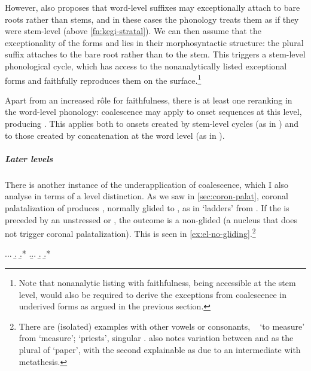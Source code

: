 However, \citet{bermúdez-otero11:_cyclic,bermudez-oterong} also proposes that word-level suffixes may exceptionally attach to bare roots rather than stems, and in these cases the phonology treats them as if they were stem-level (\cf above \cref{fn:kegi-stratal}). We can then assume that the exceptionality of the forms \ipa{[ˈbɒrdiəw]} and \ipa{[avɔˈkadiən]} lies in their morphosyntactic structure: the plural suffix attaches to the bare root rather than to the stem. This triggers a stem-level phonological cycle, which has access to the nonanalytically listed exceptional forms and faithfully reproduces them on the surface.\footnote{Note that nonanalytic listing with faithfulness, being accessible at the stem level, would also be required to derive the exceptions from coalescence in underived forms as argued in the previous section.}

Apart from an increased rôle for faithfulness, there is at least one reranking in the word\hyp level phonology: coalescence may apply to onset \ipa{[ki]} sequences at this level, producing \ipa{[ʧ]}. This applies both to \ipa{[kj]} onsets created by stem\hyp level cycles (as in \ipa{[ˈʧɛzəɡ̊]}) and to those created by concatenation at the word level (as in \ipa{[ˈlastiʧəw]}).


\subparagraph{Later levels}
\label{sec:later-levels}

There is another instance of the underapplication of coalescence, which I also analyse in terms of a level distinction. As we saw in \cref{sec:coron-palat}, coronal palatalization of \ipa{[l]} produces \ipa{[i]}, normally glided to \ipa{[j]}, as in \ipa{[ˈsʧøːjəw]} `ladders' from . If the \ipa{[l]} is preceded by an unstressed \ipa{[ə]} or \ipa{[ɛ]}, the outcome is a non-glided \ipa{[i]} (\ie a nucleus that does not trigger coronal palatalization). This is seen in \cref{ex:el-no-gliding}.\footnote{There are (isolated) examples with other vowels or consonants, \eg\ \ipa{[ˈmyzio]} `to measure' from \ipa{[ˈmyzyl]} `measure'; \ipa{[ˈbɛːliən]} `priests', singular \ipa{[ˈbɛːləɡ̊]}. \citet{humphreys95:_phonol_bothoa_saint_nicol_pelem} also notes variation between \ipa{[ˈpapərjəw]} and \ipa{[ˈpapriəw]} as the plural of \ipa{[ˈpapər]} `paper', with the second explainable as due to an intermediate \ipa{[paprəiəw]} with metathesis.}

\ex.\label{ex:el-no-gliding}\a.\a.
\b.\label{morzholiou}
\b.*\mbi{[mɒrʒəw]}
\z.\b.\a.
\b.
\b.*\mbi{[ˈøbjən]}

